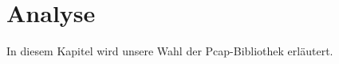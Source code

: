 \chapter{Analyse}
\label{chap:Analyse}

In diesem Kapitel wird unsere Wahl der Pcap-Bibliothek erläutert.



